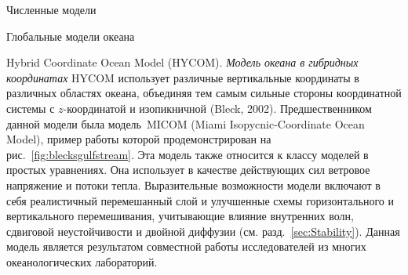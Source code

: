 \begin{chapter}{Численные модели}
\begin{section}{Глобальные модели океана}
\begin{paragraph}{Hybrid Coordinate Ocean Model (HYCOM).}
\emph{Модель океана в гибридных координатах} HYCOM
использует различные вертикальные координаты в различных областях океана,
объединяя тем самым сильные стороны координатной системы с $z$-координатой
и изопикничной (Bleck, 2002). Предшественником данной модели была модель~MICOM
(Miami Isopycnic-Coordinate Ocean Model), пример работы которой 
продемонстрирован на рис.~\ref{fig:blecksgulfstream}. Эта модель также
относится к классу моделей в простых уравнениях. Она использует в качестве
действующих сил ветровое напряжение
и потоки тепла. Выразительные возможности модели включают
в себя реалистичный перемешанный слой и улучшенные схемы горизонтального
и вертикального перемешивания, учитывающие влияние внутренних волн, сдвиговой
неустойчивости и двойной диффузии (см. разд.~\ref{sec:Stability}). Данная
модель является результатом совместной работы исследователей из многих
океанологических лабораторий.
%
\end{paragraph}



\end{section}
\end{chapter}
